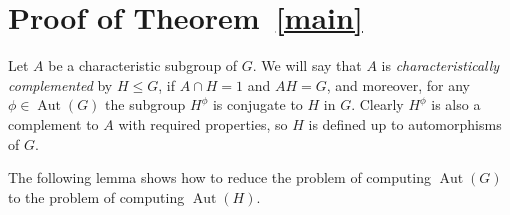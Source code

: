 \documentclass{article}
\DeclareMathOperator{\Aut}{Aut}
\begin{document}
\section{Proof of Theorem~\ref{main}}\label{secMain}

Let \( A \) be a characteristic subgroup of \( G \). We will say that \( A \) is \emph{characteristically complemented}
by \( H \leq G \), if \( A \cap H = 1 \) and \( AH = G \), and moreover, for any \( \phi \in \Aut(G) \) the subgroup \( H^\phi \)
is conjugate to \( H \) in \( G \). Clearly \( H^\phi \) is also a complement to \( A \) with required properties,
so \( H \) is defined up to automorphisms of \( G \).

The following lemma shows how to reduce the problem of computing \( \Aut(G) \) to the problem of computing \( \Aut(H) \).
\end{document}
